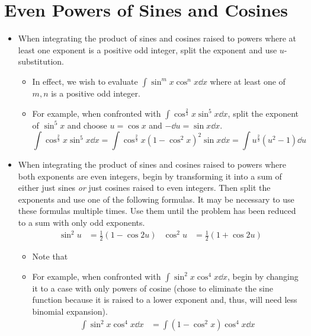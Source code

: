 \documentclass[../main.tex]{subfiles}
\begin{document}
\section{Even Powers of Sines and Cosines}
\begin{itemize}
    \item When integrating the product of sines and cosines raised to powers where at least one exponent is a positive odd integer, split the exponent and use $u$-substitution.
    \begin{itemize}
        \item In effect, we wish to evaluate $\int\sin^mx\cos^nx\dd{x}$ where at least one of $m,n$ is a positive odd integer.
        \item For example, when confronted with $\int\cos^\frac{2}{3}x\sin^5x\dd{x}$, split the exponent of $\sin^5x$ and choose $u=\cos x$ and $-\dd u=\sin x\dd{x}$.
        \begin{equation*}
            \int\cos^\frac{2}{3}x\sin^5x\dd{x} = \int\cos^\frac{2}{3}x\left( 1-\cos^2x \right)^2\sin x\dd{x}
            = \int u^\frac{2}{3}\left( u^2-1 \right)\dd{u}
        \end{equation*}
    \end{itemize}
    \item When integrating the product of sines and cosines raised to powers where both exponents are even integers, begin by transforming it into a sum of either just sines \emph{or} just cosines raised to even integers. Then split the exponents and use one of the following formulas. It may be necessary to use these formulas multiple times. Use them until the problem has been reduced to a sum with only odd exponents.
    \begin{align*}
        \sin^2u &= \frac{1}{2}(1-\cos2u)&
        \cos^2u &= \frac{1}{2}(1+\cos2u)
    \end{align*}
    \begin{itemize}
        \item Note that 
        \item For example, when confronted with $\int\sin^2x\cos^4x\dd{x}$, begin by changing it to a case with only powers of cosine (chose to eliminate the sine function because it is raised to a lower exponent and, thus, will need less binomial expansion).
        \begin{align*}
            \int\sin^2x\cos^4x\dd{x} &= \int\left( 1-\cos^2x \right)\cos^4x\dd{x}\\

\end{align*}
\end{itemize}
\end{itemize}
\end{document}
